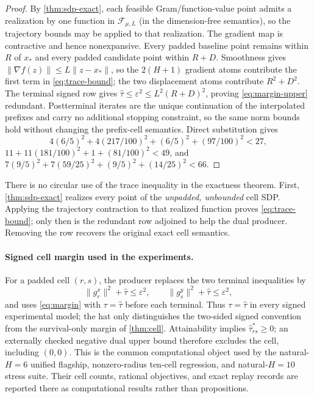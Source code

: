 \documentclass[smallextended]{svjour3}
\newcommand{\cF}{\mathcal{F}}
\newcommand{\norm}[1]{\lVert #1\rVert}
\newcommand{\eps}{\varepsilon}
\begin{document}
\begin{proof}
By \cref{thm:sdp-exact}, each feasible Gram/function-value point admits a
realization by one function in $\cF_{\mu,L}$ (in the dimension-free
semantics), so the trajectory bounds may be applied to that realization.
The gradient map is contractive and hence nonexpansive.  Every padded
baseline point remains within $R$ of $x_*$ and every padded candidate point
within $R+D$.  Smoothness gives
$\norm{\nabla f(z)}\leq L\norm{z-x_*}$, so the $2(H+1)$ gradient atoms
contribute the first term in \eqref{eq:trace-bound}; the two displacement
atoms contribute $R^2+D^2$.  The terminal signed row gives
$\widehat\tau\leq\eps^2\leq L^2(R+D)^2$, proving
\eqref{eq:margin-upper} redundant.
Postterminal iterates are the unique continuation of the interpolated
prefixes and carry no additional stopping constraint, so the same norm bounds
hold without changing the prefix-cell semantics.  Direct substitution gives
\[
4(6/5)^2+4(217/100)^2+(6/5)^2+(97/100)^2<27,
\]
$11+11(181/100)^2+1+(81/100)^2<49$, and
$7(9/5)^2+7(59/25)^2+(9/5)^2+(14/25)^2<66$.
\end{proof}

There is no circular use of the trace inequality in the exactness theorem.
First, \cref{thm:sdp-exact} realizes every point of the \emph{unpadded,
unbounded} cell SDP.  Applying the trajectory contraction to that realized
function proves \eqref{eq:trace-bound}; only then is the redundant row adjoined
to help the dual producer.  Removing the row recovers the original exact cell
semantics.

\paragraph{Signed cell margin used in the experiments.}
For a padded cell $(r,s)$, the producer replaces the two terminal inequalities
by
\begin{equation}
 \norm{g_r^x}^2+\widehat\tau\leq\eps^2,
 \qquad
 \norm{g_s^y}^2+\widehat\tau\leq\eps^2,              \label{eq:signed-terminal}
\end{equation}
and uses \eqref{eq:margin} with $\tau=\widehat\tau$ before each terminal.
Thus $\tau=\widehat\tau$ in every signed experimental model; the hat only
distinguishes the two-sided signed convention from the survival-only margin of
\cref{thm:cell}.
Attainability implies $\widehat\tau_{rs}^*\geq0$; an externally checked
negative dual upper bound therefore excludes the cell, including $(0,0)$.
This is the common computational object used by the natural-$H=6$ unified
flagship, nonzero-radius ten-cell regression, and natural-$H=10$ stress suite.
Their cell
counts, rational objectives, and exact replay records are reported there as
computational results rather than propositions.
\end{document}
